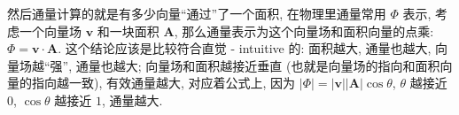 然后通量计算的就是有多少向量``通过''了一个面积, 在物理里通量常用
\(\Phi\) 表示, 考虑一个向量场 \(\boldsymbol{v}\) 和一块面积
\(\boldsymbol{A}\), 那么通量表示为这个向量场和面积向量的点乘:
\(\Phi=\boldsymbol{v}\cdot\boldsymbol{A}\). 这个结论应该是比较符合直觉 -
intuitive 的: 面积越大, 通量也越大, 向量场越``强'', 通量也越大;
向量场和面积越接近垂直 (也就是向量场的指向和面积向量的指向越一致),
有效通量越大, 对应着公式上, 因为
\(|\Phi|=|\boldsymbol{v}||\boldsymbol{A}|\cos\theta\), \(\theta\) 越接近
\(0\), \(\cos\theta\) 越接近 \(1\), 通量越大.
